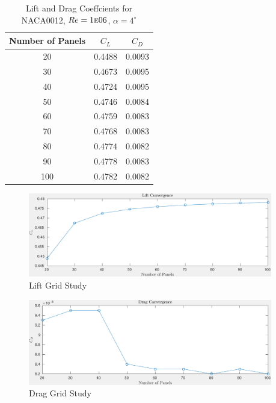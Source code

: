 \documentclass[letterpaper,12pt,]{article}
\begin{document}
\begin{table}[!h]
\centering
\begin{tabular}{ccc} \toprule
    {Number of Panels} & {$C_L$} & {$C_D$} \\ \midrule
    {20} & 0.4488  & 0.0093\\
    {30} & 0.4673  & 0.0095\\
    {40} & 0.4724  & 0.0095\\
    {50} & 0.4746  & 0.0084\\
    {60} & 0.4759  & 0.0083\\
    {70} & 0.4768  & 0.0083\\
    {80} & 0.4774  & 0.0082\\
    {90} & 0.4778  & 0.0083\\
    {100} & 0.4782  & 0.0082 \\
\bottomrule
\end{tabular}
\caption{Lift and Drag Coeffcients for NACA0012, $Re = 1\textsc{e}06$, $\alpha = 4^{\circ}$}
\label{tab1}
\end{table}

\begin{figure}[!h]
    \centering
    \includegraphics[width = 0.95\textwidth]{./figures/q1lift.pdf}
    \caption{Lift Grid Study}
    \label{fig:q1l}
\end{figure}

\begin{figure}[!h]
    \centering
    \includegraphics[width = 0.95\textwidth]{./figures/q1drag.pdf}
    \caption{Drag Grid Study}
    \label{fig:q1d}
\end{figure}
\end{document}
